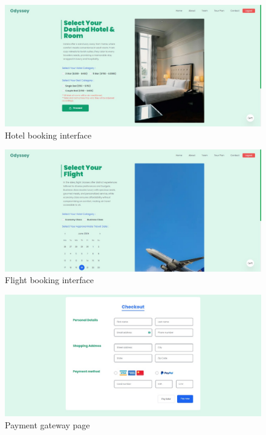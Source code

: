 \documentclass{scrreprt}
\begin{document}
\begin{figure}[h!]
    \centering
    \includegraphics[width=1.1\textwidth, height=0.35\textheight]{./SS/hotel.jpg}
    \caption{Hotel booking interface}
    \label{fig:hotel}
\end{figure}

\begin{figure}[h!]
    \centering
    \includegraphics[width=1.1\textwidth, height=0.35\textheight]{./SS/flight.jpg}
    \caption{Flight booking interface}
    \label{fig:flight}
\end{figure}

\begin{figure}[h!]
    \centering
    \includegraphics[width=1.1\textwidth, height=0.35\textheight]{./SS/payment.jpg}
    \caption{Payment gateway page}
    \label{fig:payment}
\end{figure}
\end{document}
